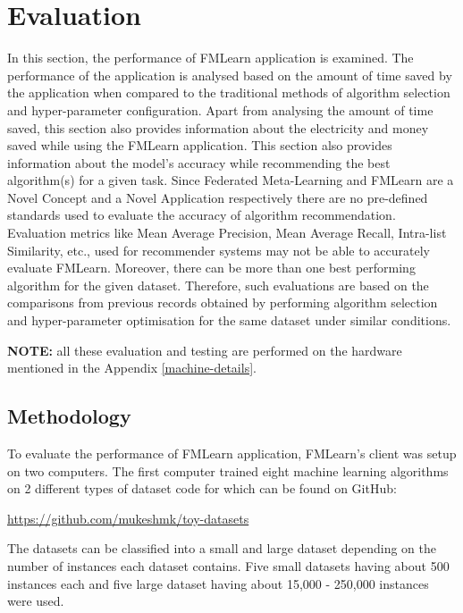 \chapter{Evaluation}

In this section, the performance of FMLearn application is examined. The performance of the application is analysed based on the amount of time saved by the application when compared to the traditional methods of algorithm selection and hyper-parameter configuration. Apart from analysing the amount of time saved, this section also provides information about the electricity and money saved while using the FMLearn application. This section also provides information about the model's accuracy while recommending the best algorithm(s) for a given task. Since Federated Meta-Learning and FMLearn are a Novel Concept and a Novel Application respectively there are no pre-defined standards used to evaluate the accuracy of algorithm recommendation. Evaluation metrics like Mean Average Precision, Mean Average Recall, Intra-list Similarity, etc., used for recommender systems may not be able to accurately evaluate FMLearn. Moreover, there can be more than one best performing algorithm for the given dataset. Therefore, such evaluations are based on the comparisons from previous records obtained by performing algorithm selection and hyper-parameter optimisation for the same dataset under similar conditions.

\textbf{NOTE:} all these evaluation and testing are performed on the hardware mentioned in the Appendix \ref{machine-details}.

\section{Methodology}

To evaluate the performance of FMLearn application, FMLearn's client was setup on two computers. The first computer trained eight machine learning algorithms on 2 different types of dataset code for which can be found on GitHub:
\begin{center}
    \href{https://github.com/mukeshmk/toy-datasets}{https://github.com/mukeshmk/toy-datasets}
\end{center}

The datasets can be classified into a small and large dataset depending on the number of instances each dataset contains. Five small datasets having about 500 instances each and five large dataset having about 15,000 - 250,000 instances were used.

